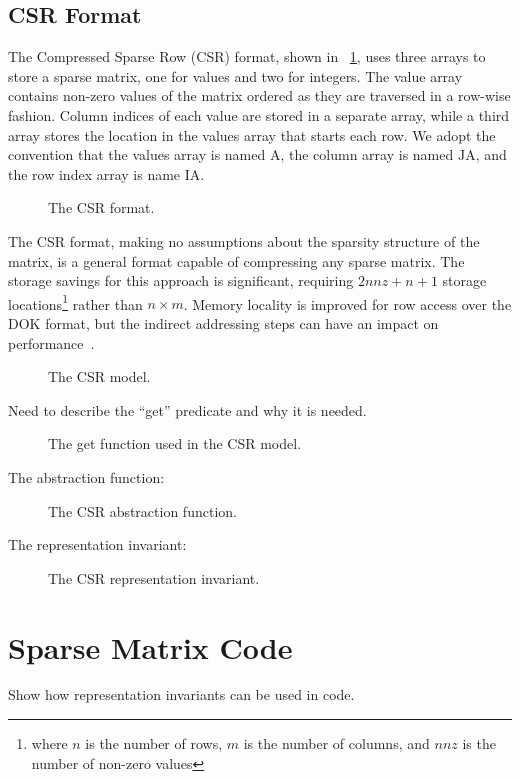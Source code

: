 \documentclass[11pt,conference]{IEEEtran}
\begin{document}
\subsection{CSR Format}

The Compressed Sparse Row (CSR) format, shown in \figurename~\ref{image:csr}, uses three arrays to store a sparse matrix, one for values and two for integers.  The value array contains non-zero values of the matrix ordered as they are traversed in a row-wise fashion.  Column indices of each value are stored in a separate array, while a third array stores the location in the values array that starts each row.  We adopt the convention that the values array is named $\mathrm{A}$, the column array is named $\mathrm{JA}$, and the row index array is name $\mathrm{IA}$.

\begin{figure}
\centering

\caption{The CSR format.}
\label{image:csr}
\end{figure}

The CSR format, making no assumptions about the sparsity structure of the matrix, is a general format capable of compressing any sparse matrix.  The storage savings for this approach is significant, requiring $2nnz+n+1$ storage locations\footnote{where $n$ is the number of rows, $m$ is the number of columns, and $nnz$ is the number of non-zero values} rather than $n \times m$.  Memory locality is improved for row access over the DOK format, but the indirect addressing steps can have an impact on performance~\cite{bai}.

\begin{figure}
\centering

\caption{The CSR model.}
\label{model:csr}
\end{figure}

Need to describe the ``get'' predicate and why it is needed.

\begin{figure}
\centering

\caption{The get function used in the CSR model.}
\label{get:csr}
\end{figure}

The abstraction function:

\begin{figure}
\centering

\caption{The CSR abstraction function.}
\label{alpha:csr}
\end{figure}

The representation invariant:

\begin{figure}
\centering

\caption{The CSR representation invariant.}
\label{repinv:csr}
\end{figure}

\section{Sparse Matrix Code}

Show how representation invariants can be used in code.



\end{document}
